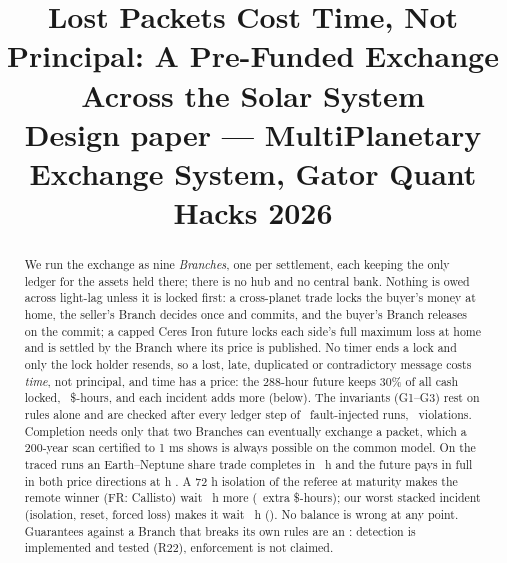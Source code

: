 \documentclass[10pt,letterpaper]{article}
\title{Lost Packets Cost Time, Not Principal: A Pre-Funded Exchange Across the Solar System \\ \large Design paper --- MultiPlanetary Exchange System, Gator Quant Hacks 2026}
\author{\teamline}
\date{}
\begin{document}
\maketitle

\begin{abstract}
We run the exchange as nine \emph{Branches}, one per settlement, each keeping the only ledger for the assets held
there; there is no hub and no central bank. Nothing is owed across light-lag unless it is locked first: a cross-planet
trade locks the buyer's money at home, the seller's Branch decides once and commits, and the buyer's Branch releases
on the commit; a capped Ceres Iron future locks each side's full maximum loss at home and is settled by the Branch
where its price is published. No timer ends a lock and only the lock holder resends, so a lost, late, duplicated or
contradictory message costs \emph{time}, not principal, and time has a price: the 288-hour future keeps 30\% of all
cash locked, \SimFutDollarHours\ \$-hours, and each incident adds more (below). The invariants (G1--G3) rest on rules
alone and are checked after every ledger step of \FuzzRuns\ fault-injected runs, \FuzzFailures\ violations. Completion needs only that two Branches can eventually exchange a packet, which a 200-year scan certified to 1 ms
shows is always possible on the common model. On the traced runs an Earth--Neptune share trade
completes in \SimVMComplete\ h and the future pays in full in both price directions at h \SimFutSpendable. A 72 h
isolation of the referee at maturity makes the remote winner (FR: Callisto) wait \SimSTwoFRLost\ h more
(\SimSTwoFRExtraDollarHours\ extra \$-hours); our worst stacked incident (isolation, reset, forced loss) makes it wait
\SimStackLost\ h (\SimStackExtraDollarHours). No balance is wrong at any point. Guarantees against a Branch that breaks
its own rules are an \extension: detection is implemented and tested (R22), enforcement is not claimed.
\end{abstract}






\end{document}
